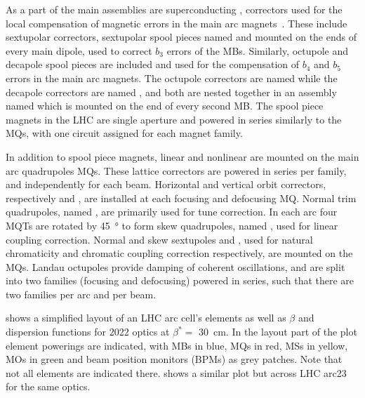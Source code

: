 
As a part of the main assemblies are superconducting , correctors used for the local compensation of magnetic errors in the main arc magnets~\cite{BOOK:Bruning:LHC_Design_Report_Main_Ring}.
These include sextupolar correctors, sextupolar spool pieces named  and mounted on the ends of every main dipole, used to correct \(b_3\) errors of the MBs.
Similarly, octupole and decapole spool pieces are included and used for the compensation of \(b_4\) and \(b_5\) errors in the main arc magnets.
The octupole correctors are named  while the decapole correctors are named , and both are nested together in an assembly named  which is mounted on the end of every second MB.
The spool piece magnets in the LHC are single aperture and powered in series similarly to the MQs, with one circuit assigned for each magnet family.

In addition to spool piece magnets, linear and nonlinear  are mounted on the main arc quadrupoles MQs.
These lattice correctors are powered in series per family, and independently for each beam.
Horizontal and vertical orbit correctors, respectively  and , are installed at each focusing and defocusing MQ.
Normal trim quadrupoles, named , are primarily used for tune correction.
In each arc four MQTs are rotated by \qty{45}{\degree} to form skew quadrupoles, named , used for linear coupling correction.
Normal and skew sextupoles  and , used for natural chromaticity and chromatic coupling correction respectively, are mounted on the MQs.
Landau octupoles  provide damping of coherent oscillations, and are split into two families (focusing and defocusing) powered in series, such that there are two families per arc and per beam.

 shows a simplified layout of an LHC arc cell's elements as well as \(\beta\) and dispersion functions for \num{2022} optics at \(\beta^{\ast} =\) \qty{30}{\centi\meter}.
In the layout part of the plot element powerings are indicated, with MBs in \textcolor{latwiss_blue}{blue}, MQs in \textcolor{latwiss_red}{red}, MSs in \textcolor{latwiss_yellow}{yellow}, MOs in \textcolor{latwiss_green}{green} and beam position monitors (BPMs) as grey patches.
Note that not all elements are indicated there.
 shows a similar plot but across LHC arc\num{23} for the same optics.

